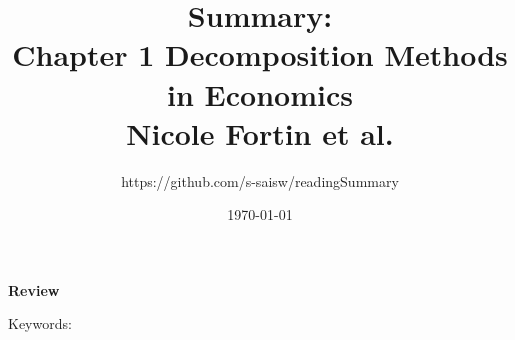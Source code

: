 \documentclass[a4paper, 12pt]{article}
\begin{document}
\pagestyle{fancy}
\setlength{\parindent}{5ex}
\setlength{\columnseprule}{0.5pt}

\title{Summary:
\\Chapter 1 Decomposition Methods in Economics \\
\large Nicole Fortin et al.
}
\author{https://github.com/s-saisw/readingSummary}
\date{\today}
\maketitle

\textbf{Review} \\

\begin{flushright}
Keywords: 
\end{flushright}
\end{document}
